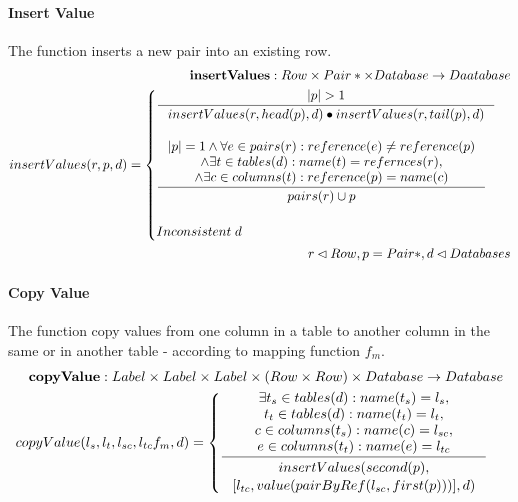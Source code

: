 \documentclass[11pt]{article}
\begin{document}
\paragraph{Insert Value} The function inserts a new pair into an existing row.
\begin{align*}
	\mathbf{insertValues} : Row \times Pair* \times Database \rightarrow Daatabase \\
	insertValues(r, p, d) = \begin{cases}
 		\inference{|p| > 1}{insertValues(r, head(p), d)\bullet insertValues(r, tail(p), d)}  \\ \\
 		\inference{|p| = 1 \wedge \forall e \in pairs(r) : reference(e) \neq reference(p) \\ \wedge \exists t \in tables(d) : name(t) = refernces(r), \\ \wedge \exists c \in columns(t) : reference(p) = name(c)}{pairs(r) \cup p} \\ \\
	 	 Inconsistent \; d
 		\end{cases} \\
r \lhd Row, p = Pair*,d \lhd Databases
\end{align*}
\paragraph{Copy Value} The function copy values from one column in a table to another column in the same or in another table - according to mapping function $f_m$. 
\begin{align*}
	\mathbf{copyValue} : Label \times Label \times Label \times (Row \times Row) \times Database \rightarrow Database \\
	copyValue(l_s, l_t, l_{sc}, l_{tc} f_m, d) = \begin{cases}
		\inference{\exists t_s \in tables(d) : name(t_s) = l_s, \\ t_t \in tables(d) : name(t_t) = l_t, \\ c \in columns(t_s) : name(c) = l_{sc}, \\ e \in columns(t_t) : name(e) = l_{tc}}{\begin{gathered}
			insertValues(second(p), \\ [l_{tc},value(pairByRef(l_{sc}, first(p)))],d)
		\end{gathered}}
 	\end{cases}
\end{align*}
\end{document}
